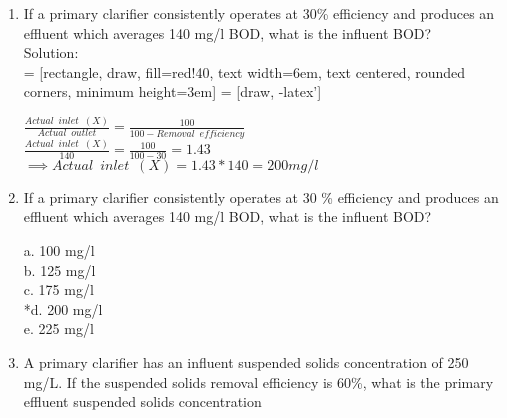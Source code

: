 \documentclass{article}
\begin{document}
\begin{enumerate}
\item If a primary clarifier consistently operates at 30\% efficiency and produces an effluent which averages 140 mg/l BOD, what is the influent BOD? \\
Solution:\\
\vspace{0.3cm}
 = [rectangle, draw, fill=red!40, 
    text width=6em, text centered, rounded corners, minimum height=3em]
 = [draw, -latex']
\begin{figure}[!h]
\centering
{}
\end{figure}
$\frac{Actual \enspace  inlet \enspace (X)}{Actual \enspace outlet}=\frac{100}{100-Removal \enspace efficiency}$\\ 
$\frac{Actual \enspace  inlet \enspace (X)}{140}=\frac{100}{100-30}=1.43$\\
$\implies Actual \enspace inlet \enspace (X)=1.43*140 = \boxed{200 mg/l}$\\



\item If a primary clarifier consistently operates at 30 \% efficiency and produces an effluent which averages 140 mg/l BOD, what is the influent BOD? 

a. 100 mg/l \\
b. 125 mg/l \\
c. 175 mg/l \\
*d. 200 mg/l \\
e. 225 mg/l \\

\item A primary clarifier has an influent suspended solids concentration of 250 mg/L. If the suspended solids removal efficiency is 60\%, what is the primary effluent suspended solids concentration \\


\end{enumerate}
\end{document}
